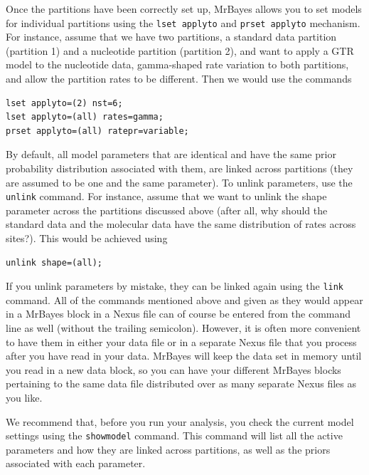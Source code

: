 \documentclass[12pt]{book}
\newcommand{\ttt}[1]{\texttt{#1} }
\begin{document}
Once the partitions have been correctly set up, MrBayes allows you to set models for individual
partitions using the \ttt{lset applyto} and \ttt{prset applyto} mechanism. For instance, assume
that we have two partitions, a standard data partition (partition 1) and a nucleotide partition
(partition 2), and want to apply a GTR model to the nucleotide data, gamma-shaped rate variation to
both partitions, and allow the partition rates to be different. Then we would use the commands

\begin{singlespacing}
\small
\begin{verbatim}
lset applyto=(2) nst=6;
lset applyto=(all) rates=gamma;
prset applyto=(all) ratepr=variable;
\end{verbatim}
\normalsize
\end{singlespacing}


By default, all model parameters that are identical and have the same prior probability
distribution associated with them, are linked across partitions (they are assumed to be one and the
same parameter). To unlink parameters, use the \ttt{unlink} command. For instance, assume that we
want to unlink the shape parameter across the partitions discussed above (after all, why should the
standard data and the molecular data have the same distribution of rates across sites?). This would
be achieved using

\begin{singlespacing}
\small
\begin{verbatim}
unlink shape=(all);
\end{verbatim}
\normalsize
\end{singlespacing}

If you unlink parameters by mistake, they can be linked again using the \ttt{link} command.  All of
the commands mentioned above and given as they would appear in a MrBayes block in a Nexus file can
of course be entered from the command line as well (without the trailing semicolon). However, it is
often more convenient to have them in either your data file or in a separate Nexus file that you
process after you have read in your data.  MrBayes will keep the data set in memory until you read
in a new data block, so you can have your different MrBayes blocks pertaining to the same data file
distributed over as many separate Nexus files as you like.

We recommend that, before you run your analysis, you check the current model settings using the
\ttt{showmodel} command. This command will list all the active parameters and how they are linked
across partitions, as well as the priors associated with each parameter.
\end{document}
